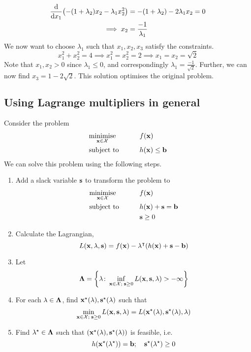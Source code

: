 \begin{example}
	\begin{align*}
		\dv{x_1} (-(1+\lambda_2) x_2 - \lambda_1 x_2^2) & = -(1+\lambda_2) - 2 \lambda_1 x_2 = 0 \\
		\implies x_2                                    & = \frac{-1}{\lambda_1}
	\end{align*}
	We now want to choose \(\lambda_1\) such that \(x_1, x_2, x_3\) satisfy the constraints.
	\[
		x_1^2 + x_2^2 = 4 \implies x_1^2 = x_2^2 = 2 \implies x_1 = x_2 = \sqrt{2}
	\]
	Note that \(x_1, x_2 > 0\) since \(\lambda_1 \leq 0\), and correspondingly \(\lambda_1 = \frac{-1}{\sqrt{2}}\).
	Further, we can now find \(x_3 = 1 - 2\sqrt{2}\).
	This solution optimises the original problem.
\end{example}

\subsection{Using Lagrange multipliers in general}
Consider the problem
\begin{alignat*}{2}
	 & \underset{\vb x \in \mathcal X}{\text{minimise}} & \qquad & f(\vb x)            \\
	 & \text{subject to}                                &        & h(\vb x) \leq \vb b
\end{alignat*}
We can solve this problem using the following steps.
\begin{enumerate}[(1)]
	\item Add a slack variable \(\vb s\) to transform the problem to
	      \begin{alignat*}{2}
		       & \underset{\vb x \in \mathcal X}{\text{minimise}} & \qquad & f(\vb x)                 \\
		       & \text{subject to}                                &        & h(\vb x) + \vb s = \vb b \\
		       &                                                  &        & \vb s \geq 0
	      \end{alignat*}
	\item Calculate the Lagrangian,
	      \[
		      L(\vb x, \vb \lambda, \vb s) = f(\vb x) - \vb \lambda^\intercal (h(\vb x) + \vb s - \vb b)
	      \]
	\item Let
	      \[
		      \vb \Lambda = \qty{\vb \lambda \colon \inf_{\vb x \in \mathcal X;\; \vb s \geq 0} L(\vb x, \vb s, \vb \lambda) > -\infty}
	      \]
	\item For each \(\vb\lambda \in \vb\Lambda\), find \(\vb x^\star(\vb \lambda), \vb s^\star(\vb \lambda)\) such that
	      \[
		      \min_{\vb x \in \mathcal X;\; \vb s \geq 0} L(\vb x, \vb s, \vb \lambda) = L(\vb x^\star(\vb \lambda), \vb s^\star(\vb \lambda), \vb \lambda)
	      \]
	\item Find \(\vb\lambda^\star \in \vb\Lambda\) such that \((\vb x^\star(\vb \lambda), \vb s^\star(\vb \lambda))\) is feasible, i.e.
	      \[
		      h(\vb x^\star(\vb \lambda^\star)) = \vb b;\quad \vb s^\star (\vb \lambda^\star) \geq 0
	      \]
\end{enumerate}

